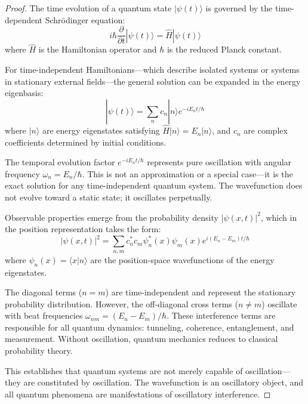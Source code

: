 \documentclass[12pt,a4paper]{article}
\theoremstyle{definition}
\theoremstyle{remark}
\begin{document}
\begin{proof}
The time evolution of a quantum state $|\psi(t)\rangle$ is governed by the time-dependent Schrödinger equation:
\begin{equation}
i\hbar \frac{\partial}{\partial t}|\psi(t)\rangle = \hat{H}|\psi(t)\rangle
\end{equation}
where $\hat{H}$ is the Hamiltonian operator and $\hbar$ is the reduced Planck constant.

For time-independent Hamiltonians—which describe isolated systems or systems in stationary external fields—the general solution can be expanded in the energy eigenbasis:
\begin{equation}
|\psi(t)\rangle = \sum_n c_n |n\rangle e^{-iE_n t/\hbar}
\end{equation}
where $|n\rangle$ are energy eigenstates satisfying $\hat{H}|n\rangle = E_n|n\rangle$, and $c_n$ are complex coefficients determined by initial conditions.

The temporal evolution factor $e^{-iE_n t/\hbar}$ represents pure oscillation with angular frequency $\omega_n = E_n/\hbar$. This is not an approximation or a special case—it is the exact solution for any time-independent quantum system. The wavefunction does not evolve toward a static state; it oscillates perpetually.

Observable properties emerge from the probability density $|\psi(x,t)|^2$, which in the position representation takes the form:
\begin{equation}
|\psi(x,t)|^2 = \sum_{n,m} c_n^* c_m \psi_n^*(x) \psi_m(x) e^{i(E_n - E_m)t/\hbar}
\end{equation}
where $\psi_n(x) = \langle x | n \rangle$ are the position-space wavefunctions of the energy eigenstates.

The diagonal terms ($n = m$) are time-independent and represent the stationary probability distribution. However, the off-diagonal cross terms ($n \neq m$) oscillate with beat frequencies $\omega_{nm} = (E_n - E_m)/\hbar$. These interference terms are responsible for all quantum dynamics: tunneling, coherence, entanglement, and measurement. Without oscillation, quantum mechanics reduces to classical probability theory.

This establishes that quantum systems are not merely capable of oscillation—they are constituted by oscillation. The wavefunction is an oscillatory object, and all quantum phenomena are manifestations of oscillatory interference.
\end{proof}
\end{document}
